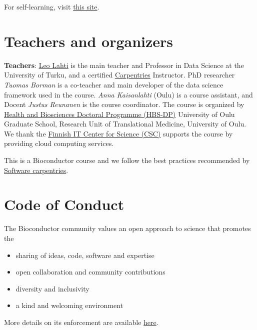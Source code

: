 \documentclass[
  oneside]{book}
\providecommand{\tightlist}{%
  \setlength{\itemsep}{0pt}\setlength{\parskip}{0pt}}
\begin{document}
For self-learning, visit \href{https://microbiome.github.io/OMA/docs/devel/pages/training.html}{this site}.

\hypertarget{teachers-and-organizers}{%
\section{Teachers and organizers}\label{teachers-and-organizers}}

\textbf{Teachers}: \href{https://datascience.utu.fi}{Leo Lahti} is the main teacher and Professor in Data Science at the University of Turku, and a certified \href{https://carpentries.org}{Carpentries} Instructor. PhD researcher \emph{Tuomas Borman} is a co-teacher and main developer of the data science framework used in the course. \emph{Anna Kaisanlahti} (Oulu) is a course assistant, and Docent \emph{Justus Reunanen} is the course coordinator. The course is organized by \href{https://www.oulu.fi/en/research/graduate-school/organisation-and-contact-information-uniogs/health-and-biosciences-doctoral-programme}{Health and Biosciences Doctoral Programme (HBS-DP)} University of Oulu Graduate School, Research Unit of Translational Medicine, University of Oulu. We thank the \href{https://csc.fi/}{Finnish IT Center for Science (CSC)} supports the course by providing cloud computing services.

This is a Bioconductor course \citet{Soneson2024} and we follow the best practices recommended by \href{https://carpentries.org}{Software carpentries}.

\hypertarget{code-of-conduct}{%
\section{Code of Conduct}\label{code-of-conduct}}

The Bioconductor community values an open approach to science that promotes the

\begin{itemize}
\tightlist
\item
  sharing of ideas, code, software and expertise
\item
  open collaboration and community contributions
\item
  diversity and inclusivity
\item
  a kind and welcoming environment
\end{itemize}

More details on its enforcement are available \href{https://bioconductor.github.io/bioc_coc_multilingual/}{here}.
\end{document}
